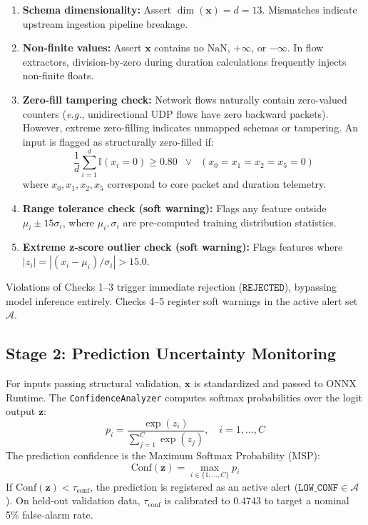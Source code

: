 \documentclass[journal]{IEEEtran}
\newcommand{\eg}{\emph{e.g.}}
\begin{document}
\begin{enumerate}[leftmargin=*]
  \item \textbf{Schema dimensionality:} Assert $\dim(\mathbf{x}) = d = 13$. Mismatches indicate upstream ingestion pipeline breakage.
  \item \textbf{Non-finite values:} Assert $\mathbf{x}$ contains no $\text{NaN}$, $+\infty$, or $-\infty$. In flow extractors, division-by-zero during duration calculations frequently injects non-finite floats.
  \item \textbf{Zero-fill tampering check:} Network flows naturally contain zero-valued counters (\eg, unidirectional UDP flows have zero backward packets). However, extreme zero-filling indicates unmapped schemas or tampering. An input is flagged as structurally zero-filled if:
  \begin{equation}
    \frac{1}{d}\sum_{i=1}^d \mathbb{I}(x_i = 0) \ge 0.80 \;\;\lor\;\; (x_0 = x_1 = x_2 = x_5 = 0)
    \label{eq:zerofill}
  \end{equation}
  where $x_0, x_1, x_2, x_5$ correspond to core packet and duration telemetry.
  \item \textbf{Range tolerance check (soft warning):} Flags any feature outside $\mu_i \pm 15\sigma_i$, where $\mu_i, \sigma_i$ are pre-computed training distribution statistics.
  \item \textbf{Extreme z-score outlier check (soft warning):} Flags features where $|z_i| = |(x_i - \mu_i)/\sigma_i| > 15.0$.
\end{enumerate}

Violations of Checks 1--3 trigger immediate rejection ($\texttt{REJECTED}$), bypassing model inference entirely. Checks 4--5 register soft warnings in the active alert set $\mathcal{A}$.

\subsection{Stage 2: Prediction Uncertainty Monitoring}
\label{sec:confidence}
For inputs passing structural validation, $\mathbf{x}$ is standardized and passed to ONNX Runtime. The \texttt{ConfidenceAnalyzer} computes softmax probabilities over the logit output $\mathbf{z}$:
\begin{equation}
  p_i = \frac{\exp(z_i)}{\sum_{j=1}^{C} \exp(z_j)}, \quad i = 1, \ldots, C
  \label{eq:softmax}
\end{equation}
The prediction confidence is the Maximum Softmax Probability (MSP):
\begin{equation}
  \text{Conf}(\mathbf{z}) = \max_{i \in \{1, \ldots, C\}} p_i
  \label{eq:msp}
\end{equation}
If $\text{Conf}(\mathbf{z}) < \tau_{\text{conf}}$, the prediction is registered as an active alert ($\texttt{LOW\_CONF} \in \mathcal{A}$). On held-out validation data, $\tau_{\text{conf}}$ is calibrated to $0.4743$ to target a nominal 5\% false-alarm rate.
\end{document}

